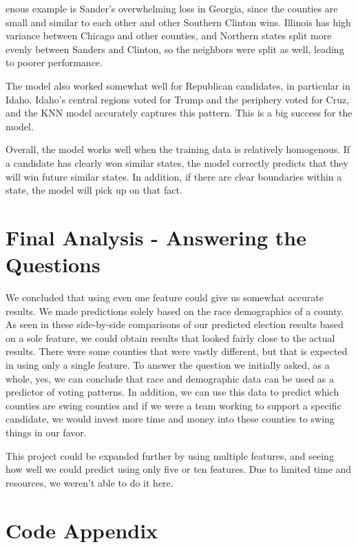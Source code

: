 \documentclass[11pt]{article}
\begin{document}
enous example is Sander's overwhelming loss in Georgia, since the counties are small and similar to each other and other Southern Clinton wins. Illinois has high variance between Chicago and other counties, and Northern states split more evenly between Sanders and Clinton, so the neighbors were split as well, leading to poorer performance. 

The model also worked somewhat well for Republican candidates, in particular in Idaho. Idaho's central regions voted for Trump and the periphery voted for Cruz, and the KNN model accurately captures this pattern. This is a big success for the model. 

Overall, the model works well when the training data is relatively homogenous. If a candidate has clearly won similar states, the model correctly predicts that they will win future similar states. In addition, if there are clear boundaries within a state, the model will pick up on that fact. 

\newpage

\section*{Final Analysis - Answering the Questions}
We concluded that using even one feature could give us somewhat accurate results. We made predictions solely based on the race demographics of a county. As seen in these side-by-side comparisons of our predicted election results based on a sole feature, we could obtain results that looked fairly close to the actual results. There were some counties that were vastly different, but that is expected in using only a single feature. To answer the question we initially asked, as a whole, yes, we can conclude that race and demographic data can be used as a predictor of voting patterns. In addition, we can use this data to predict which counties are swing counties and if we were a team working to support a specific candidate, we would invest more time and money into these counties to swing things in our favor. 

This project could be expanded further by using multiple features, and seeing how well we could predict using only five or ten features. Due to limited time and resources, we weren’t able to do it here. 


\newpage

\section*{Code Appendix}

\newpage

\newpage

\end{document}
